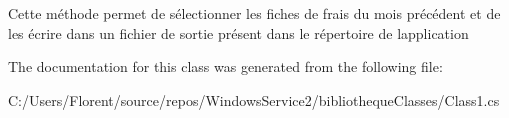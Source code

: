 Cette méthode permet de sélectionner les fiches de frais du mois précédent et de les écrire dans un fichier de sortie présent dans le répertoire de l\textquotesingle{}application 



The documentation for this class was generated from the following file\+:\begin{DoxyCompactItemize}
\item 
C\+:/\+Users/\+Florent/source/repos/\+Windows\+Service2/bibliotheque\+Classes/Class1.\+cs\end{DoxyCompactItemize}
